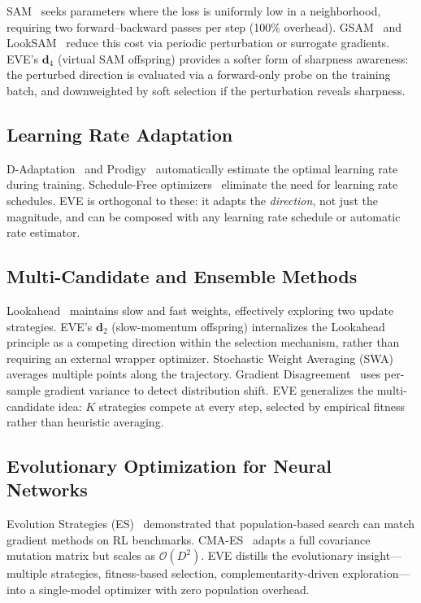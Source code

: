 \documentclass[12pt]{article}
\begin{document}
SAM~\cite{foret2021sharpnessaware} seeks parameters where the loss is
uniformly low in a neighborhood, requiring two forward--backward passes
per step (100\% overhead).
GSAM~\cite{zhuang2022surrogate} and LookSAM~\cite{liu2022towards}
reduce this cost via periodic perturbation or surrogate gradients.
EVE's $\mathbf{d}_4$ (virtual SAM offspring) provides a softer form of
sharpness awareness: the perturbed direction is evaluated via a
forward-only probe on the training batch, and downweighted by soft
selection if the perturbation reveals sharpness.

\subsection{Learning Rate Adaptation}

D-Adaptation~\cite{defazio2023dadaptation} and Prodigy~\cite{mishchenko2024prodigy}
automatically estimate the optimal learning rate during training.
Schedule-Free optimizers~\cite{defazio2024schedulefree} eliminate the
need for learning rate schedules.
EVE is orthogonal to these: it adapts the \emph{direction}, not just
the magnitude, and can be composed with any learning rate schedule or
automatic rate estimator.

\subsection{Multi-Candidate and Ensemble Methods}

Lookahead~\cite{zhang2019lookahead} maintains slow and fast weights,
effectively exploring two update strategies.
EVE's $\mathbf{d}_2$ (slow-momentum offspring) internalizes the
Lookahead principle as a competing direction within the selection
mechanism, rather than requiring an external wrapper optimizer.
Stochastic Weight Averaging (SWA)~\cite{izmailov2018averaging} averages
multiple points along the trajectory.
Gradient Disagreement~\cite{mansilla2021domain} uses per-sample gradient
variance to detect distribution shift.
EVE generalizes the multi-candidate idea: $K$ strategies compete at
every step, selected by empirical fitness rather than heuristic averaging.

\subsection{Evolutionary Optimization for Neural Networks}

Evolution Strategies (ES)~\cite{salimans2017evolution} demonstrated that
population-based search can match gradient methods on RL benchmarks.
CMA-ES~\cite{hansen2001cma} adapts a full covariance mutation matrix
but scales as $\mathcal{O}(D^2)$.
EVE distills the evolutionary insight---multiple strategies, fitness-based
selection, complementarity-driven exploration---into a single-model
optimizer with zero population overhead.
\end{document}
